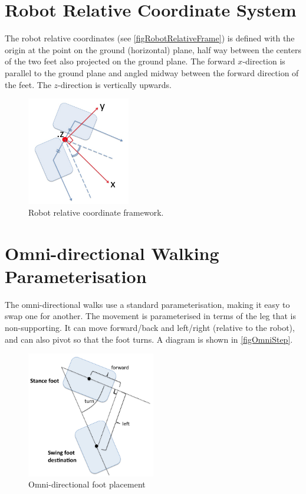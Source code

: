 \documentclass[pdftex,11pt,a4paper]{report}
\begin{document}
\section{Robot Relative Coordinate System}
\label{appendixRRS}
The robot relative coordinates (see \autoref{figRobotRelativeFrame})  is defined with the origin at the point on the ground (horizontal) plane, half way between the centers of the two feet also projected on the ground plane. The forward $x$-direction is parallel to the ground plane and angled midway between the forward direction of the feet. The $z$-direction is vertically upwards.
\begin{figure} [ht]
\centering
\includegraphics[width=0.4\textwidth]{figures/RobotRelativeCoordFrame.jpg}
\caption{Robot relative coordinate framework.} \label{figRobotRelativeFrame}
\end{figure}

\section{Omni-directional Walking Parameterisation}\label{sectionWalkingParameterisation}
The omni-directional walks use a standard parameterisation, making it
easy to swap one for another. The movement is parameterised in terms of the
leg that is non-supporting. It can move forward/back and left/right
(relative to the robot), and can also pivot so that the foot turns. A
diagram is shown in \autoref{figOmniStep}.

\begin{figure} [ht]
\centering
\includegraphics[width=0.5\textwidth]{figures/OmniStep.jpg}
\caption{Omni-directional foot placement} \label{figOmniStep}
\end{figure}
\end{document}

